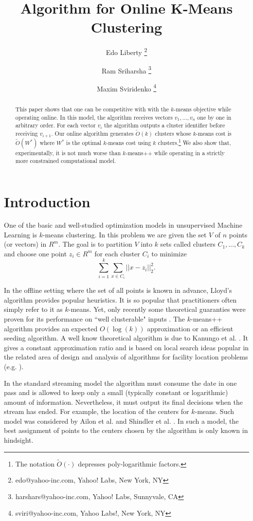 \documentclass{article}
\title{Algorithm for Online K-Means Clustering}
\author{
	Edo Liberty \thanks{edo@yahoo-inc.com, Yahoo! Labs, New York, NY}
		\and
	Ram Sriharsha \thanks{harshars@yahoo-inc.com, Yahoo! Labs, Sunnyvale, CA}
       		\and 
	Maxim Sviridenko \thanks{sviri@yahoo-inc.com, Yahoo Labs!, New York, NY}
}
\begin{document}
\date{}
\maketitle{}
\mbox{}
\begin{abstract}
This paper shows that one can be competitive with with the $k$-means objective while operating online.
In this model, the algorithm receives vectors $v_1,\ldots,v_n$ one by one in arbitrary order. 
For each vector $v_i$ the algorithm outputs a cluster identifier before receiving $v_{i+1}$.
Our online algorithm generates $\tilde{O}(k)$ clusters whose $k$-means cost is $\tilde{O}(W^*)$ where $W^*$ is the optimal $k$-means cost using $k$ clusters.\footnote{The notation $\tilde{O}(\cdot)$ depresses poly-logarithmic factors.}
We also show that, experimentally, it is not much worse than $k$-means++ while operating in a strictly more constrained computational model.
\end{abstract}
\section{Introduction}

One of the basic and well-studied optimization models in unsupervised Machine Learning is $k$-means clustering. In this problem we are given the set $V$ of $n$ points (or vectors) in $R^m$. The goal is to partition $V$ into $k$ sets called clusters $C_1,\dots, C_k$ and choose one point $z_i\in R^m$ for each cluster $C_i$ to minimize 
$$\sum_{i=1}^{k} \sum_{x\in C_i} ||x-z_i||_2^2.$$

In the offline setting where the set of all points is known in advance, Lloyd's algorithm \cite{Lloyd82} provides popular heuristics. 
It is so popular that practitioners often simply refer to it as $k$-means. 
Yet, only recently some theoretical guaranties were proven for its performance on ``well clusterable" inputs \cite{OstrovskyRSS12}.
The $k$-means++ \cite{ArthurV07} algorithm provides an expected  $O(\log(k))$ approximation or an efficient seeding algorithm. 
A well know theoretical algorithm is due to Kanungo et al. \cite{KanungoMNPSW02}. 
It gives a constant approximation ratio and is based on local search ideas popular in the related area of design and analysis of algorithms for facility location problems (e.g. \cite{AryaGKMMP04}).


In the standard streaming model the algorithm must consume the date in one pass and is allowed to keep only a small (typically constant or logarithmic) amount of information. 
Nevertheless, it must output its final decisions when the stream has ended. For example, the location of the centers for $k$-means.
Such model was considered by Ailon et al. \cite{AilonJM09} and Shindler et al. \cite{SWM}. In such a model, the best assignment of points to the centers chosen by the algorithm is only known in hindsight.
\end{document}
